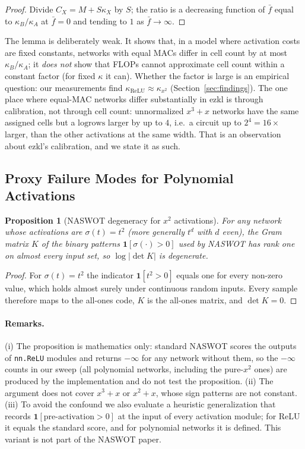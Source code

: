 \documentclass[10pt]{article}
\newtheorem{proposition}[theorem]{Proposition}
\newcommand{\logrows}{\mathrm{logrows}}
\begin{document}
\begin{proof}
Divide $C_X=M+S\kappa_X$ by $S$; the ratio is a decreasing function of $\bar f$ equal to
$\kappa_B/\kappa_A$ at $\bar f=0$ and tending to $1$ as $\bar f\to\infty$.
\end{proof}

The lemma is deliberately weak.  It shows that, in a model where activation costs are fixed
constants, networks with equal MACs differ in cell count by at most $\kappa_B/\kappa_A$; it
\emph{does not} show that FLOPs cannot approximate cell count within a constant factor (for fixed
$\kappa$ it can).  Whether the factor is large is an empirical question: our measurements find
$\kappa_{\mathrm{ReLU}}\approx\kappa_{x^2}$ (Section~\ref{sec:findings}).  The one place where
equal-MAC networks differ substantially in ezkl is through calibration, not through cell count: unnormalized
$x^3{+}x$ networks have the same assigned cells but a $\logrows$ larger by up to $4$, i.e.\ a circuit up
to $2^4=16\times$ larger, than the other activations at the same width.  That is an observation
about ezkl's calibration, and we state it as such.

\subsection{Proxy Failure Modes for Polynomial Activations}

\begin{proposition}[NASWOT degeneracy for $x^2$ activations]
\label{prop:naswot}
For any network whose activations are $\sigma(t)=t^2$ (more generally $t^d$ with $d$ even), the
Gram matrix $K$ of the binary patterns $\mathbf{1}[\sigma(\cdot)>0]$ used by NASWOT has rank one on
almost every input set, so $\log|\det K|$ is degenerate.
\end{proposition}

\begin{proof}
For $\sigma(t)=t^2$ the indicator $\mathbf{1}[t^2>0]$ equals one for every non-zero value, which
holds almost surely under continuous random inputs.  Every sample therefore maps to the all-ones code,
$K$ is the all-ones matrix, and $\det K=0$.
\end{proof}

\paragraph{Remarks.}
(i) The proposition is mathematics only: standard NASWOT scores the outputs of \texttt{nn.ReLU}
modules and returns $-\infty$ for any network without them, so the $-\infty$ counts in our sweep
(all polynomial networks, including the pure-$x^2$ ones) are produced by the implementation and do
not test the proposition.  (ii) The argument does not cover $x^3{+}x$ or $x^2{+}x$, whose sign patterns are not
constant.  (iii) To avoid the confound we also evaluate a heuristic generalization that records
$\mathbf{1}[\text{pre-activation}>0]$ at the input of every activation module; for ReLU it equals the
standard score, and for polynomial networks it is defined.  This variant is not part of the NASWOT paper.
\end{document}
